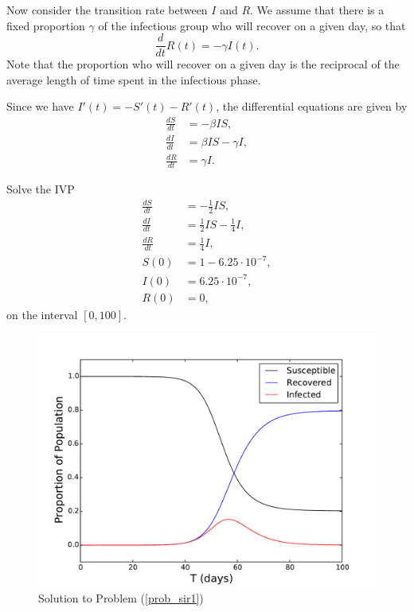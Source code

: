  Now consider the transition rate between $I$ and $R$. We assume that there is a fixed proportion $\gamma$ of the infectious group who will recover on a given day, so that 
 \[\frac{d}{dt}R(t) = -\gamma I(t).\]
 Note that the proportion who will recover on a given day is the reciprocal of the average length of time spent in the infectious phase. 
 
 Since we have $I'(t) = - S'(t) - R'(t)$, the  differential equations are given by
\begin{align*}
\frac{dS}{dt} &=-\beta IS ,\\
\frac{dI}{dt} &= \beta I S-\gamma I, \\
\frac{dR}{dt} &=\gamma I.
\end{align*}


\begin{problem}
Solve the IVP
\begin{align*}
\frac{dS}{dt} &=-\frac{1}{2} IS ,\\
\frac{dI}{dt} &= \frac{1}{2} I S-\frac{1}{4} I, \\
\frac{dR}{dt} &=\frac{1}{4} I,\\
S(0) &= 1-6.25\cdot10^{-7},\\
I(0) &= 6.25\cdot10^{-7},\\
R(0) &=0,
\end{align*}
on the interval $[0,100]$. \label{prob_sir1}
\end{problem}

\begin{figure}[ht]
\centering
\includegraphics[width=\textwidth]{SIR1.pdf}
\caption{Solution to Problem (\ref{prob_sir1}) }
\label{sir1}
\end{figure}

